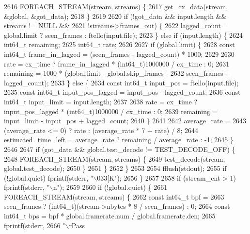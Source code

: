 \begin{DoxyCodeInclude}
{{{{{{{{{{{{{{{{{{{{{{{{{{{{{{{{{{{{{{{{{{{{{{{{{{{{{{{{{{{{{{{{{{{{{{{{{2616         FOREACH\_STREAM(stream, streams) \{
2617           get\_cx\_data(stream, &global, &got\_data);
2618         \}
2619 
2620         \textcolor{keywordflow}{if} (!got\_data && input.length && streams != NULL &&
2621             !streams->frames\_out) \{
2622           lagged\_count = global.limit ? seen\_frames : ftello(input.file);
2623         \} \textcolor{keywordflow}{else} \textcolor{keywordflow}{if} (input.length) \{
2624           int64\_t remaining;
2625           int64\_t rate;
2626 
2627           \textcolor{keywordflow}{if} (global.limit) \{
2628             \textcolor{keyword}{const} int64\_t frame\_in\_lagged = (seen\_frames - lagged\_count) * 1000;
2629 
2630             rate = cx\_time ? frame\_in\_lagged * (int64\_t)1000000 / cx\_time : 0;
2631             remaining = 1000 * (global.limit - global.skip\_frames -
2632                 seen\_frames + lagged\_count);
2633           \} \textcolor{keywordflow}{else} \{
2634             \textcolor{keyword}{const} int64\_t input\_pos = ftello(input.file);
2635             \textcolor{keyword}{const} int64\_t input\_pos\_lagged = input\_pos - lagged\_count;
2636             \textcolor{keyword}{const} int64\_t input\_limit = input.length;
2637 
2638             rate = cx\_time ? input\_pos\_lagged * (int64\_t)1000000 / cx\_time : 0;
2639             remaining = input\_limit - input\_pos + lagged\_count;
2640           \}
2641 
2642           average\_rate =
2643               (average\_rate <= 0) ? rate : (average\_rate * 7 + rate) / 8;
2644           estimated\_time\_left = average\_rate ? remaining / average\_rate : -1;
2645         \}
2646 
2647         \textcolor{keywordflow}{if} (got\_data && global.test\_decode != TEST\_DECODE\_OFF) \{
2648           FOREACH\_STREAM(stream, streams) \{
2649             test\_decode(stream, global.test\_decode);
2650           \}
2651         \}
2652       \}
2653 
2654       fflush(stdout);
2655       \textcolor{keywordflow}{if} (!global.quiet) fprintf(stderr, \textcolor{stringliteral}{"\(\backslash\)033[K"});
2656     \}
2657 
2658     \textcolor{keywordflow}{if} (stream\_cnt > 1) fprintf(stderr, \textcolor{stringliteral}{"\(\backslash\)n"});
2659 
2660     \textcolor{keywordflow}{if} (!global.quiet) \{
2661       FOREACH\_STREAM(stream, streams) \{
2662         \textcolor{keyword}{const} int64\_t bpf =
2663             seen\_frames ? (int64\_t)(stream->nbytes * 8 / seen\_frames) : 0;
2664         \textcolor{keyword}{const} int64\_t bps = bpf * global.framerate.num / global.framerate.den;
2665         fprintf(stderr,
2666             \textcolor{stringliteral}{"\(\backslash\)rPass %
}}}}}}}}}}}}}}}}}}}}}}}}}}}}}}}}}}}}}}}}}}}}}}}}}}}}}}}}}}}}}}}}}}}}}}}}}}
\end{DoxyCodeInclude}
